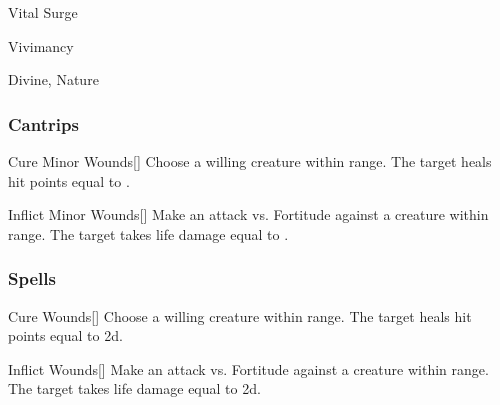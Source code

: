 \newpage
\begin{spellsection}{Vital Surge}

\begin{spellheader}
\end{spellheader}


 Vivimancy

 Divine, Nature

\subsubsection{Cantrips}


\begin{freeability}{Cure Minor Wounds}[]
Choose a willing creature within \rngmed range.
The target heals hit points equal to .
\end{freeability}


\begin{freeability}{Inflict Minor Wounds}[]
Make an attack vs. Fortitude against a creature within \rngmed range.
\hit The target takes life damage equal to .
\end{freeability}

\end{spellsection}


\subsubsection{Spells}


\lowercase{\hypertarget{spell:Cure Wounds}{}}\label{spell:Cure Wounds}
\begin{apability}[\nth{1}]{\hypertarget{spell:Cure Wounds}{Cure Wounds}}[]
Choose a willing creature within \rngmed range.
The target heals hit points equal to  \plus2d.
\end{apability}
\vspace{0.25em}



\lowercase{\hypertarget{spell:Inflict Wounds}{}}\label{spell:Inflict Wounds}
\begin{apability}[\nth{1}]{\hypertarget{spell:Inflict Wounds}{Inflict Wounds}}[]
Make an attack vs. Fortitude against a creature within \rngmed range.
\hit The target takes life damage equal to  \plus2d.
\end{apability}
\vspace{0.25em}



